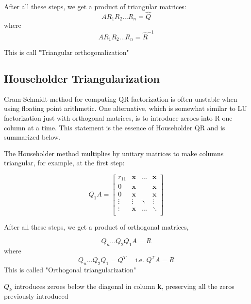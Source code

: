 \documentclass{article}
\begin{document}
After all these steps, we get a product of triangular matrices:
\begin{equation*}
    AR_{1}R_{2}...R_{n}=\hat{Q}
\end{equation*}
where
\begin{equation*}
    AR_{1}R_{2}...R_{n}=\hat{R}^{-1}
\end{equation*}

This is call "Triangular orthogonalization"

\subsection{Householder Triangularization}
Gram-Schmidt method for computing QR factorization is often unstable when using floating point arithmetic. One alternative, which is somewhat similar to LU factorization just with orthogonal matrices, is to introduce zeroes into R one column at a time. This statement is the essence of Householder QR and is summarized below.

The Householder method multiplies by unitary matrices to make columns triangular, for example, at the first step: 

$$
Q_{1}A = \left [\begin{array}{cccc}
r_{11} & \mathbf{x} & ... & \mathbf{x} \\
0       & \mathbf{x} &     &\mathbf{x}  \\
0       & \mathbf{x} &     &\mathbf{x}  \\
\vdots       &    \vdots    &\ddots &  \vdots\\
\vdots       &     \mathbf{x}   &  ...     & \ddots \\
\end{array}\right]
$$

After all these steps, we get a product of orthogonal matrices,

$$
    Q_{n}...Q_{2}Q_{1}A=R
$$
where
$$
    Q_{n}...Q_{2}Q_{1}=Q^{T} \quad \text{ i.e. } Q^{T}A=R
$$
This is called "Orthogonal triangularization"


$Q_k$ introduces zeroes below the diagonal in column \textbf{k}, preserving all the zeros previously introduced
\end{document}
